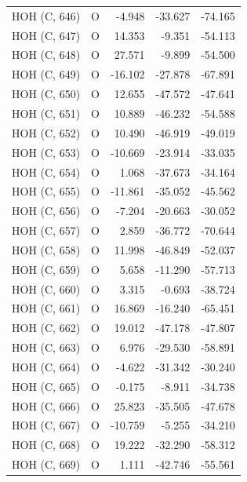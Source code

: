 \begin{longtable}{@{}lcrr@{}}
  \cmidrule(r){1-5}
  HOH (C, 646) & O & -4.948 & -33.627 & -74.165 \\
  \cmidrule(r){1-5}
  HOH (C, 647) & O & 14.353 & -9.351 & -54.113 \\
  \cmidrule(r){1-5}
  HOH (C, 648) & O & 27.571 & -9.899 & -54.500 \\
  \cmidrule(r){1-5}
  HOH (C, 649) & O & -16.102 & -27.878 & -67.891 \\
  \cmidrule(r){1-5}
  HOH (C, 650) & O & 12.655 & -47.572 & -47.641 \\
  \cmidrule(r){1-5}
  HOH (C, 651) & O & 10.889 & -46.232 & -54.588 \\
  \cmidrule(r){1-5}
  HOH (C, 652) & O & 10.490 & -46.919 & -49.019 \\
  \cmidrule(r){1-5}
  HOH (C, 653) & O & -10.669 & -23.914 & -33.035 \\
  \cmidrule(r){1-5}
  HOH (C, 654) & O & 1.068 & -37.673 & -34.164 \\
  \cmidrule(r){1-5}
  HOH (C, 655) & O & -11.861 & -35.052 & -45.562 \\
  \cmidrule(r){1-5}
  HOH (C, 656) & O & -7.204 & -20.663 & -30.052 \\
  \cmidrule(r){1-5}
  HOH (C, 657) & O & 2.859 & -36.772 & -70.644 \\
  \cmidrule(r){1-5}
  HOH (C, 658) & O & 11.998 & -46.849 & -52.037 \\
  \cmidrule(r){1-5}
  HOH (C, 659) & O & 5.658 & -11.290 & -57.713 \\
  \cmidrule(r){1-5}
  HOH (C, 660) & O & 3.315 & -0.693 & -38.724 \\
  \cmidrule(r){1-5}
  HOH (C, 661) & O & 16.869 & -16.240 & -65.451 \\
  \cmidrule(r){1-5}
  HOH (C, 662) & O & 19.012 & -47.178 & -47.807 \\
  \cmidrule(r){1-5}
  HOH (C, 663) & O & 6.976 & -29.530 & -58.891 \\
  \cmidrule(r){1-5}
  HOH (C, 664) & O & -4.622 & -31.342 & -30.240 \\
  \cmidrule(r){1-5}
  HOH (C, 665) & O & -0.175 & -8.911 & -34.738 \\
  \cmidrule(r){1-5}
  HOH (C, 666) & O & 25.823 & -35.505 & -47.678 \\
  \cmidrule(r){1-5}
  HOH (C, 667) & O & -10.759 & -5.255 & -34.210 \\
  \cmidrule(r){1-5}
  HOH (C, 668) & O & 19.222 & -32.290 & -58.312 \\
  \cmidrule(r){1-5}
  HOH (C, 669) & O & 1.111 & -42.746 & -55.561 \\

\end{longtable}
